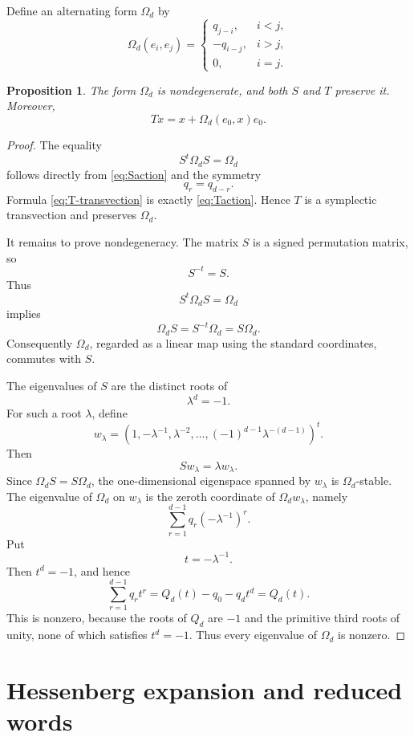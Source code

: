 \documentclass[a4paper,11pt]{amsart}
\newtheorem{proposition}[theorem]{Proposition}
\theoremstyle{remark}
\numberwithin{equation}{section}
\begin{document}
Define an alternating form \(\Omega_d\) by
\begin{equation}\label{eq:Omega}
\Omega_d(e_i,e_j)=
\begin{cases}
q_{j-i},&i<j,\\
-q_{i-j},&i>j,\\
0,&i=j.
\end{cases}
\end{equation}

\begin{proposition}\label{prop:symplectic-form}
The form \(\Omega_d\) is nondegenerate, and both \(S\) and \(T\) preserve it. Moreover,
\begin{equation}\label{eq:T-transvection}
Tx=x+\Omega_d(e_0,x)e_0.
\end{equation}
\end{proposition}

\begin{proof}
The equality
\[
S^t\Omega_dS=\Omega_d
\]
follows directly from \eqref{eq:Saction} and the symmetry
\[
q_r=q_{d-r}.
\]
Formula \eqref{eq:T-transvection} is exactly \eqref{eq:Taction}. Hence \(T\) is a symplectic transvection and preserves \(\Omega_d\).

It remains to prove nondegeneracy. The matrix \(S\) is a signed permutation matrix, so
\[
S^{-t}=S.
\]
Thus
\[
S^t\Omega_dS=\Omega_d
\]
implies
\[
\Omega_dS=S^{-t}\Omega_d=S\Omega_d.
\]
Consequently \(\Omega_d\), regarded as a linear map using the standard coordinates, commutes with \(S\).

The eigenvalues of \(S\) are the distinct roots of
\[
\lambda^d=-1.
\]
For such a root \(\lambda\), define
\[
w_\lambda=
\left(
1,-\lambda^{-1},\lambda^{-2},\ldots,
(-1)^{d-1}\lambda^{-(d-1)}
\right)^t.
\]
Then
\[
Sw_\lambda=\lambda w_\lambda.
\]
Since \(\Omega_dS=S\Omega_d\), the one-dimensional eigenspace spanned by \(w_\lambda\) is \(\Omega_d\)-stable. The eigenvalue of \(\Omega_d\) on \(w_\lambda\) is the zeroth coordinate of \(\Omega_dw_\lambda\), namely
\[
\sum_{r=1}^{d-1}q_r(-\lambda^{-1})^r.
\]
Put
\[
t=-\lambda^{-1}.
\]
Then \(t^d=-1\), and hence
\[
\sum_{r=1}^{d-1}q_rt^r
=
Q_d(t)-q_0-q_dt^d
=
Q_d(t).
\]
This is nonzero, because the roots of \(Q_d\) are \(-1\) and the primitive third roots of unity, none of which satisfies \(t^d=-1\). Thus every eigenvalue of \(\Omega_d\) is nonzero.
\end{proof}

\section{Hessenberg expansion and reduced words}
\end{document}
